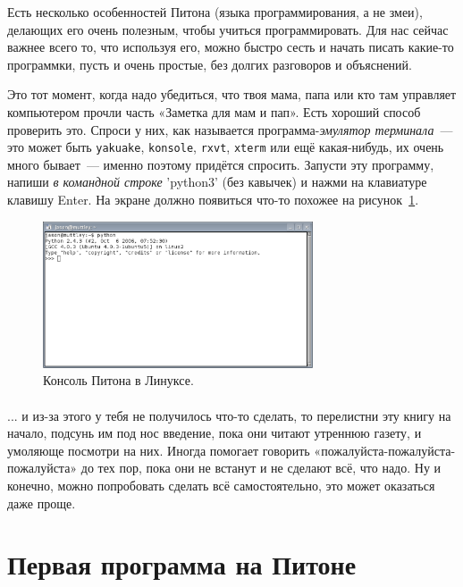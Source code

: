 Есть несколько особенностей Питона (языка программирования, а не змеи), делающих его очень полезным, чтобы учиться программировать. Для нас сейчас важнее всего то, что используя его, можно быстро сесть и начать писать какие-то программки, пусть и очень простые, без долгих разговоров и объяснений.

Это тот момент, когда надо убедиться, что твоя мама, папа или кто там управляет компьютером прочли часть «Заметка для мам и пап». Есть хороший способ проверить это. Спроси у них, как называется программа-\emph{эмулятор терминала} — это может быть \texttt{yakuake}, \texttt{konsole}, \texttt{rxvt}, \texttt{xterm} или ещё какая-нибудь, их очень много бывает — именно поэтому придётся спросить. Запусти эту программу, напиши \emph{в командной строке} 'python3' (без кавычек) и нажми на клавиатуре клавишу Enter. На экране должно появиться что-то похожее на рисунок \ref{fig4}.

\begin{figure}
\begin{center}
\includegraphics[width=80mm]{../en/figure4.eps}
\end{center}
\caption{Консоль Питона в Линуксе.}\label{fig4}
\end{figure}

\begin{samepage}
\nopagebreak
\paragraph*{}
... и из-за этого у тебя не получилось что-то сделать, то перелистни эту книгу на начало, подсунь им под нос введение, пока они читают утреннюю газету, и умоляюще посмотри на них. Иногда помогает говорить «пожалуйста-пожалуйста-пожалуйста» до тех пор, пока они не встанут и не сделают всё, что надо. Ну и конечно, можно попробовать сделать всё самостоятельно, это может оказаться даже проще.
\end{samepage}

\section{Первая программа на Питоне}

